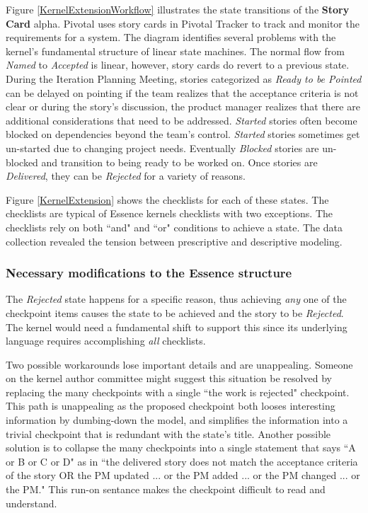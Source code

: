 \documentclass[preprint,12pt,3p]{elsarticle}
\begin{document}
Figure \ref{KernelExtensionWorkflow} illustrates the state transitions of the \textbf{Story Card} alpha. Pivotal uses story cards in Pivotal Tracker to track and monitor the requirements for a system. The diagram identifies several problems with the kernel's fundamental structure of linear state machines. The normal flow from \textit{Named} to \textit{Accepted} is linear, however, story cards do revert to a previous state. During the Iteration Planning Meeting, stories categorized as \textit{Ready to be Pointed} can be delayed on pointing if the team realizes that the acceptance criteria is not clear or during the story's discussion, the product manager realizes that there are additional considerations that need to be addressed. \textit{Started} stories often become blocked on dependencies beyond the team's control. \textit{Started} stories sometimes get un-started due to changing project needs. Eventually \textit{Blocked} stories are un-blocked and transition to being ready to be worked on. Once stories are \textit{Delivered}, they can be \textit{Rejected} for a variety of 
reasons.

Figure \ref{KernelExtension} shows the checklists for each of these states. The checklists are typical of Essence kernels checklists with two exceptions. The checklists rely on both ``and" and  ``or" conditions to achieve a state. The data collection revealed the tension between prescriptive and descriptive modeling.

\subsubsection{Necessary modifications to the Essence structure}

The \textit{Rejected} state happens for a specific reason, thus achieving \textit{any} one of the checkpoint items causes the state to be achieved and the story to be \textit{Rejected}. The kernel would need a fundamental shift to support this since its underlying language requires accomplishing \textit{all} checklists. 

Two possible workarounds lose important details and are unappealing. Someone on the kernel author committee might suggest this situation be resolved by replacing the many checkpoints with a single ``the work is rejected" checkpoint. This path is unappealing as the proposed checkpoint both looses interesting information by dumbing-down the model, and simplifies the information into a trivial checkpoint that is redundant with the state's title. Another possible solution is to collapse the many checkpoints into a single statement that says ``A or B or C or D" as in ``the delivered story does not match the acceptance criteria of the story OR the PM updated ... or the PM added ... or the PM changed ... or the PM." This run-on sentance makes the checkpoint difficult to read and understand. 
\end{document}

